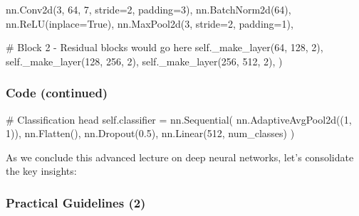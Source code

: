 \documentclass[
]{article}
\newenvironment{Shaded}{\begin{snugshade}}{\end{snugshade}}
\newcommand{\CommentTok}[1]{\textcolor[rgb]{0.37,0.37,0.37}{#1}}
\newcommand{\DecValTok}[1]{\textcolor[rgb]{0.68,0.00,0.00}{#1}}
\newcommand{\FloatTok}[1]{\textcolor[rgb]{0.68,0.00,0.00}{#1}}
\newcommand{\NormalTok}[1]{\textcolor[rgb]{0.00,0.23,0.31}{#1}}
\newcommand{\OperatorTok}[1]{\textcolor[rgb]{0.37,0.37,0.37}{#1}}
\newcommand{\VariableTok}[1]{\textcolor[rgb]{0.07,0.07,0.07}{#1}}
\begin{document}
\begin{Shaded}
\begin{Highlighting}[]
\NormalTok{            nn.Conv2d(}\DecValTok{3}\NormalTok{, }\DecValTok{64}\NormalTok{, }\DecValTok{7}\NormalTok{, stride}\OperatorTok{=}\DecValTok{2}\NormalTok{, padding}\OperatorTok{=}\DecValTok{3}\NormalTok{),}
\NormalTok{            nn.BatchNorm2d(}\DecValTok{64}\NormalTok{),}
\NormalTok{            nn.ReLU(inplace}\OperatorTok{=}\VariableTok{True}\NormalTok{),}
\NormalTok{            nn.MaxPool2d(}\DecValTok{3}\NormalTok{, stride}\OperatorTok{=}\DecValTok{2}\NormalTok{, padding}\OperatorTok{=}\DecValTok{1}\NormalTok{),}
            
            \CommentTok{\# Block 2 {-} Residual blocks would go here}
            \VariableTok{self}\NormalTok{.\_make\_layer(}\DecValTok{64}\NormalTok{, }\DecValTok{128}\NormalTok{, }\DecValTok{2}\NormalTok{),}
            \VariableTok{self}\NormalTok{.\_make\_layer(}\DecValTok{128}\NormalTok{, }\DecValTok{256}\NormalTok{, }\DecValTok{2}\NormalTok{),}
            \VariableTok{self}\NormalTok{.\_make\_layer(}\DecValTok{256}\NormalTok{, }\DecValTok{512}\NormalTok{, }\DecValTok{2}\NormalTok{),}
\NormalTok{        )}
\end{Highlighting}
\end{Shaded}

\subsubsection{Code (continued)}\label{code-continued-4}

\begin{Shaded}
\begin{Highlighting}[]
        
        \CommentTok{\# Classification head}
        \VariableTok{self}\NormalTok{.classifier }\OperatorTok{=}\NormalTok{ nn.Sequential(}
\NormalTok{            nn.AdaptiveAvgPool2d((}\DecValTok{1}\NormalTok{, }\DecValTok{1}\NormalTok{)),}
\NormalTok{            nn.Flatten(),}
\NormalTok{            nn.Dropout(}\FloatTok{0.5}\NormalTok{),}
\NormalTok{            nn.Linear(}\DecValTok{512}\NormalTok{, num\_classes)}
\NormalTok{        )}
\end{Highlighting}
\end{Shaded}

As we conclude this advanced lecture on deep neural networks, let's
consolidate the key insights:

\subsubsection{Practical Guidelines (2)}\label{practical-guidelines-2}
\end{document}
